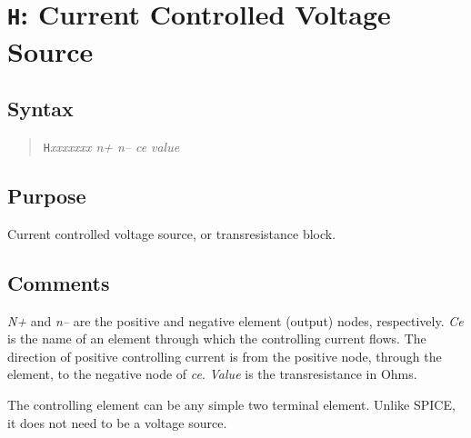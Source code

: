 \section{{\tt H}: Current Controlled Voltage Source}
\subsection{Syntax}
\begin{verse}
{\tt H}{\it xxxxxxx n+ n-- ce} {\it value}
\end{verse}
\subsection{Purpose}

Current controlled voltage source, or transresistance block.
\subsection{Comments}

{\it N+} and {\it n--} are the positive and negative element (output)
nodes, respectively.  {\it Ce} is the name of an element through
which the controlling current flows.  The direction of positive
controlling current is from the positive node, through the element,
to the negative node of {\it ce}.  {\it Value} is the transresistance
in Ohms.

The controlling element can be any simple two terminal element.
Unlike SPICE, it does not need to be a voltage source.
